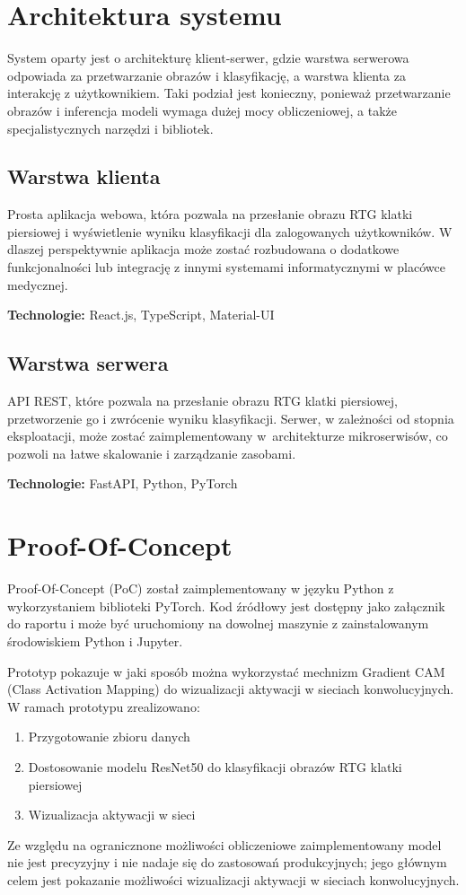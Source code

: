 \documentclass{article}
\begin{document}
\section{Architektura systemu}
System oparty jest o architekturę klient-serwer, gdzie warstwa serwerowa odpowiada za przetwarzanie obrazów i klasyfikację, a warstwa klienta za interakcję z użytkownikiem.
Taki podział jest konieczny, ponieważ przetwarzanie obrazów i inferencja modeli wymaga dużej mocy obliczeniowej, a także specjalistycznych narzędzi i bibliotek.

\subsection{Warstwa klienta}
Prosta aplikacja webowa, która pozwala na przesłanie obrazu RTG klatki piersiowej i wyświetlenie wyniku klasyfikacji dla zalogowanych użytkowników.
W dlaszej perspektywnie aplikacja może zostać rozbudowana o dodatkowe funkcjonalności lub integrację z innymi systemami informatycznymi w placówce medycznej.

\textbf{Technologie:} React.js, TypeScript, Material-UI


\subsection{Warstwa serwera}
API REST, które pozwala na przesłanie obrazu RTG klatki piersiowej, przetworzenie go i zwrócenie wyniku klasyfikacji.
Serwer, w zależności od stopnia eksploatacji, może zostać zaimplementowany w~architekturze mikroserwisów, co pozwoli na łatwe skalowanie i zarządzanie zasobami.

\textbf{Technologie:} FastAPI, Python, PyTorch

\section{Proof-Of-Concept}
Proof-Of-Concept (PoC) został zaimplementowany w języku Python z wykorzystaniem biblioteki PyTorch. Kod źródłowy jest dostępny jako załącznik do raportu i może być uruchomiony na dowolnej maszynie z zainstalowanym środowiskiem Python i Jupyter.

Prototyp pokazuje w jaki sposób można wykorzystać mechnizm Gradient CAM (Class Activation Mapping) \cite{selvaraju2017gradcam} do wizualizacji aktywacji w sieciach konwolucyjnych.
W ramach prototypu zrealizowano:
\begin{enumerate}
  \item Przygotowanie zbioru danych
  \item Dostosowanie modelu ResNet50 do klasyfikacji obrazów RTG klatki piersiowej
  \item Wizualizacja aktywacji w sieci
\end{enumerate}
Ze względu na ogranicznone możliwości obliczeniowe zaimplementowany model nie jest precyzyjny i nie nadaje się do zastosowań produkcyjnych;
jego głównym celem jest pokazanie możliwości wizualizacji aktywacji w sieciach konwolucyjnych.
\end{document}
